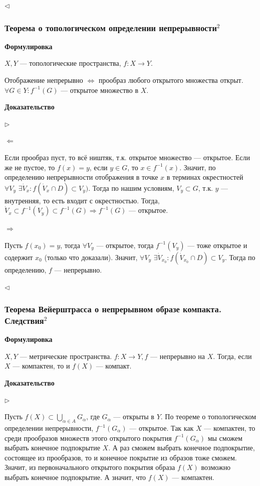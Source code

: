 \documentclass{article}
\def\dbl{\,\,}
\begin{document}
$\lhd$


\subsubsection{Теорема о топологическом определении непрерывности\texorpdfstring{$^2$}{}}

\textbf{Формулировка}

$X, Y$ --- топологические пространства, $f: X \rightarrow Y$.

Отображение непрерывно $\Leftrightarrow$ прообраз любого открытого множества открыт. $\forall G \in Y : f^{-1}(G)$ --- открытое множество в $X$.

\textbf{Доказательство}

$\rhd$

$\Leftarrow$

Если прообраз пуст, то всё ништяк, т.к. открытое множество --- открытое. Если же не пустое, то $f(x) = y$, если $y \in G$, то $x \in f^{-1}(x)$. Значит, по определению непрерывности отображения в точке $x$ в терминах окрестностей $\forall V_y \dbl \exists \dot{V}_x : f(\dot{V}_x \cap D) \subset V_y)$. Тогда по нашим условиям, $V_y \subset G$, т.к. $y$ --- внутренняя, то есть входит с окрестностью. Тогда, $\dot{V}_x \subset f^{-1}(V_y) \subset f^{-1}(G) \Rightarrow f^{-1}(G)$ --- открытое.

$\Rightarrow$

Пусть $f(x_0) = y$, тогда $\forall V_y$ --- открытое, тогда $f^{-1}(V_y)$ --- тоже открытое и содержит $x_0$ (только что доказали). Значит, $\forall V_y \dbl \exists \dot{V}_{x_0} : f(\dot{V}_{x_0} \cap D) \subset V_y$. Тогда по определению, $f$ --- непрерывно.

$\lhd$

\subsubsection{Теорема Вейерштрасса о непрерывном образе компакта. Следствия\texorpdfstring{$^2$}{}}

\textbf{Формулировка}

$X, Y$ --- метрические пространства. $f: X \rightarrow Y, f$ --- непрерывно на $X$. Тогда, если $X$ --- компактен, то и $f(X)$ --- компакт.

\textbf{Доказательство}

$\rhd$

Пусть $f(X) \subset \bigcup_{\alpha \in A}G_\alpha$, где $G_\alpha$ --- открыты в $Y$. По теореме о топологическом определении непрерывности, $f^{-1}(G_\alpha)$ --- открытое. Так как $X$ --- компактен, то среди прообразов множеств этого открытого покрытия $f^{-1}(G_\alpha)$ мы сможем выбрать конечное подпокрытие $X$. А раз сможем выбрать конечное подпокрытие, состоящее из прообразов, то и конечное покрытие из образов тоже сможем. Значит, из первоначального открытого покрытия образа $f(X)$ возможно выбрать конечное подпокрытие. А значит, что $f(X)$ --- компактен.
\end{document}
